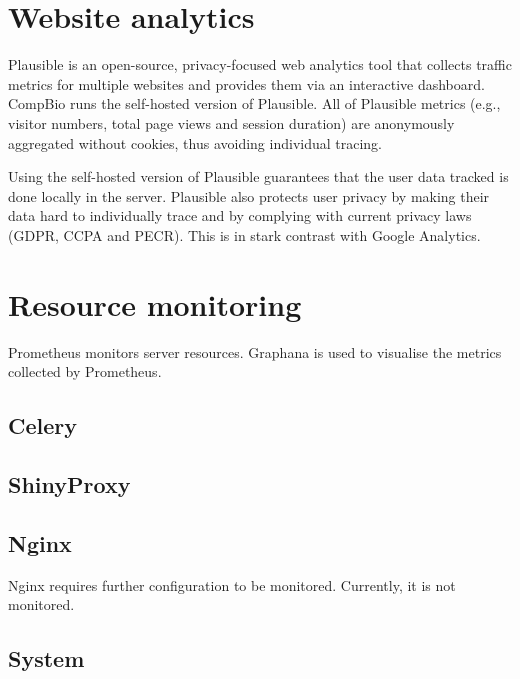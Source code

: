 \section{Website analytics}

Plausible is an open-source, privacy-focused web analytics tool that collects traffic metrics for multiple websites and provides them via an interactive dashboard. CompBio runs the self-hosted version of Plausible. All of Plausible metrics (e.g., visitor numbers, total page views and session duration) are anonymously aggregated without cookies, thus avoiding individual tracing.


Using the self-hosted version of Plausible guarantees that the user data tracked is done locally in the server. Plausible also protects user privacy by making their data hard to individually trace and by complying with current privacy laws (GDPR, CCPA and PECR). This is in stark contrast with Google Analytics.

\section{Resource monitoring}

Prometheus monitors server resources. Graphana is used to visualise the metrics collected by Prometheus.

\subsection{Celery}

\subsection{ShinyProxy}

\subsection{Nginx}

Nginx requires further configuration to be monitored. Currently, it is not monitored.

\subsection{System}

